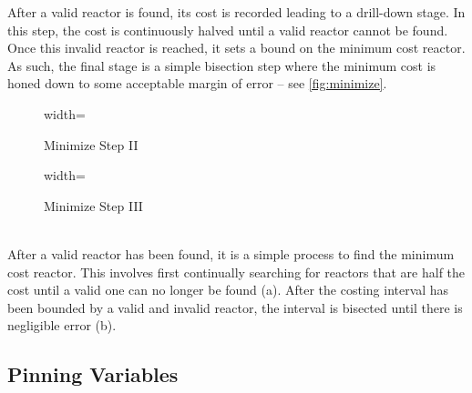 %	

After a valid reactor is found, its cost is recorded leading to a drill-down stage. In this step, the cost is continuously halved until a valid reactor cannot be found. Once this invalid reactor is reached, it sets a bound on the minimum cost reactor. As such, the final stage is a simple bisection step where the minimum cost is honed down to some acceptable margin of error -- see \cref{fig:minimize}.

\begin{figure*}
    \centering
    \begin{subfigure}[t]{0.725\textwidth}
        \centering
		\begin{adjustbox}{width=\textwidth}
			\Large
			
		\end{adjustbox}
        \caption{ Minimize Step II }
    \end{subfigure}
    \par \bigskip \par \bigskip
    \begin{subfigure}[t]{0.725\textwidth}
        \centering
		\begin{adjustbox}{width=\textwidth}
			\Large
			
		\end{adjustbox}
        \caption{ Minimize Step III }
    \end{subfigure}
    \par \bigskip \par \bigskip
    \caption{Reactor Cost Minimization}
    \label{fig:minimize} ~ \\
    \small{ After a valid reactor has been found, it is a simple process to find the minimum cost reactor. This involves first continually searching for reactors that are half the cost until a valid one can no longer be found (a). After the costing interval has been bounded by a valid and invalid reactor, the interval is bisected until there is negligible error (b).}
\end{figure*}

\subsection{Pinning  Variables}

